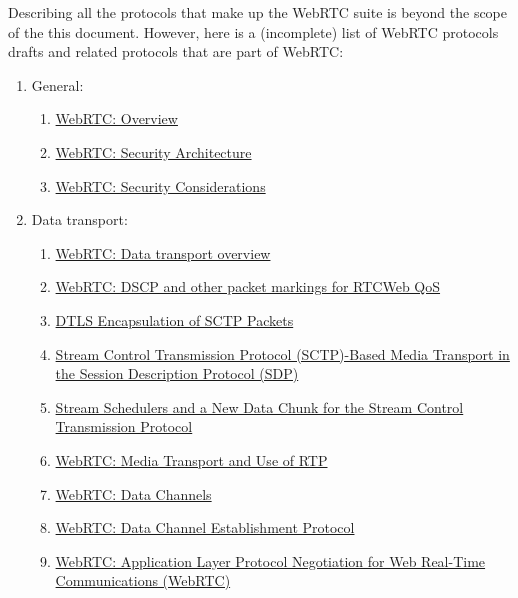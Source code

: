 \documentclass{acmtog} %
\begin{document}
Describing all the protocols that make up the WebRTC suite is beyond
the scope of the this document. However, here is a (incomplete) list
of WebRTC protocols drafts and related protocols that are
part of WebRTC:

\begin{enumerate}
\item General:
    \begin{enumerate}
    \item \href{https://tools.ietf.org/html/draft-ietf-rtcweb-overview-13}{WebRTC: Overview}
    \item \href{https://tools.ietf.org/html/draft-ietf-rtcweb-security-arch-11}{WebRTC: Security Architecture}
    \item \href{https://tools.ietf.org/html/draft-ietf-rtcweb-security-08}{WebRTC: Security Considerations}
    \end{enumerate}
\item Data transport:
    \begin{enumerate}
    \item \href{https://tools.ietf.org/html/draft-ietf-rtcweb-transports-08}{WebRTC: Data transport overview}
    \item \href{https://tools.ietf.org/html/draft-ietf-tsvwg-rtcweb-qos-03}{WebRTC: DSCP and other packet markings for RTCWeb QoS}
    \item \href{https://tools.ietf.org/html/draft-ietf-tsvwg-sctp-dtls-encaps-09}{DTLS Encapsulation of SCTP Packets}
    \item \href{https://tools.ietf.org/html/draft-ietf-mmusic-sctp-sdp-14}{Stream Control Transmission Protocol (SCTP)-Based Media Transport in the Session Description Protocol (SDP)}
    \item \href{https://tools.ietf.org/html/draft-ietf-tsvwg-sctp-ndata-02}{Stream Schedulers and a New Data Chunk for the Stream Control Transmission Protocol}
    \item \href{https://tools.ietf.org/html/draft-ietf-rtcweb-rtp-usage-23}{WebRTC: Media Transport and Use of RTP}
    \item \href{https://tools.ietf.org/html/draft-ietf-rtcweb-data-channel-13}{WebRTC: Data Channels}
    \item \href{https://tools.ietf.org/html/draft-ietf-rtcweb-data-protocol-09}{WebRTC: Data Channel Establishment Protocol}
    \item \href{https://tools.ietf.org/html/draft-ietf-rtcweb-alpn-01}{WebRTC: Application Layer Protocol Negotiation for Web Real-Time Communications (WebRTC)}

\end{enumerate}
\end{enumerate}
\end{document}
